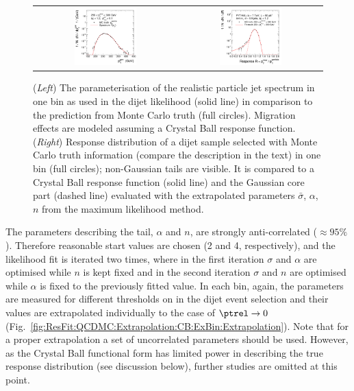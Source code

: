 \begin{figure}[ht]
  \centering
  \begin{tabular}{cc}
    \includegraphics[width=0.45\textwidth]{figures/ResFit_Spring10QCDFlat_CB_Eta0_Spectrum_PtBin4} &
    \includegraphics[width=0.45\textwidth]{figures/ResFit_Spring10QCDFlat_CB_Eta0_MCClosure_PtBin4}
  \end{tabular}
\caption{(\textit{Left}) The parameterisation of the realistic particle jet \pt spectrum in one \pt bin as used in the dijet likelihood (solid line) in comparison to the prediction from Monte Carlo truth (full circles).
  Migration effects are modeled assuming a Crystal Ball response function. 
  (\textit{Right}) Response distribution of a dijet sample selected with Monte Carlo truth information (compare the description in the text) in one \pt bin (full circles); non-Gaussian tails are visible.
  It is compared to a Crystal Ball response function (solid line) and the Gaussian core part (dashed line) evaluated with the extrapolated parameters $\bar{\sigma}$, $\alpha$, $n$ from the maximum likelihood method.}
\label{fig:ResFit:QCDMC:Extrapolation:CB:ExBin:SpectrumAndMCClosure}
\end{figure}

The parameters describing the tail, $\alpha$ and $n$, are strongly anti-correlated ($\approx95\%$).
Therefore reasonable start values are chosen (2 and 4, respectively), and the likelihood fit is iterated two times, where in the first iteration $\sigma$ and $\alpha$ are optimised while $n$ is kept fixed and in the second iteration $\sigma$ and $n$ are optimised while $\alpha$ is fixed to the previously fitted value.
In each \pt bin, again, the parameters are measured for different thresholds on \ptrel in the dijet event selection and their values are extrapolated individually to the case of $\ptrel\rightarrow0$ (Fig.~\ref{fig:ResFit:QCDMC:Extrapolation:CB:ExBin:Extrapolation}).
Note that for a proper extrapolation a set of uncorrelated parameters should be used.
However, as the Crystal Ball functional form has limited power in describing the true response distribution (see discussion below), further studies are omitted at this point.

